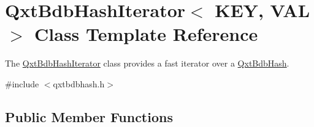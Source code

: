 \hypertarget{class_qxt_bdb_hash_iterator}{\section{Qxt\-Bdb\-Hash\-Iterator$<$ K\-E\-Y, V\-A\-L $>$ Class Template Reference}
\label{class_qxt_bdb_hash_iterator}
}


The \hyperlink{class_qxt_bdb_hash_iterator}{Qxt\-Bdb\-Hash\-Iterator} class provides a fast iterator over a \hyperlink{class_qxt_bdb_hash}{Qxt\-Bdb\-Hash}.  




{\ttfamily \#include $<$qxtbdbhash.\-h$>$}

\subsection*{Public Member Functions}
